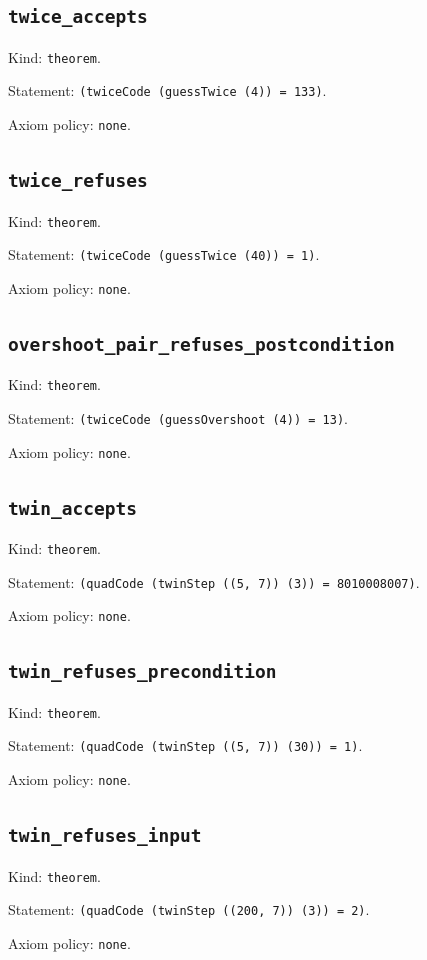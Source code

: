 \documentclass[11pt]{article}
\begin{document}
\subsection*{\texttt{twice\_accepts}}
\noindent Kind: \texttt{theorem}.\par
\noindent Statement: \texttt{(twiceCode (guessTwice (4)) = 133)}.\par
\noindent Axiom policy: \texttt{none}.\par
\subsection*{\texttt{twice\_refuses}}
\noindent Kind: \texttt{theorem}.\par
\noindent Statement: \texttt{(twiceCode (guessTwice (40)) = 1)}.\par
\noindent Axiom policy: \texttt{none}.\par
\subsection*{\texttt{overshoot\_pair\_refuses\_postcondition}}
\noindent Kind: \texttt{theorem}.\par
\noindent Statement: \texttt{(twiceCode (guessOvershoot (4)) = 13)}.\par
\noindent Axiom policy: \texttt{none}.\par
\subsection*{\texttt{twin\_accepts}}
\noindent Kind: \texttt{theorem}.\par
\noindent Statement: \texttt{(quadCode (twinStep ((5, 7)) (3)) = 8010008007)}.\par
\noindent Axiom policy: \texttt{none}.\par
\subsection*{\texttt{twin\_refuses\_precondition}}
\noindent Kind: \texttt{theorem}.\par
\noindent Statement: \texttt{(quadCode (twinStep ((5, 7)) (30)) = 1)}.\par
\noindent Axiom policy: \texttt{none}.\par
\subsection*{\texttt{twin\_refuses\_input}}
\noindent Kind: \texttt{theorem}.\par
\noindent Statement: \texttt{(quadCode (twinStep ((200, 7)) (3)) = 2)}.\par
\noindent Axiom policy: \texttt{none}.\par
\end{document}
